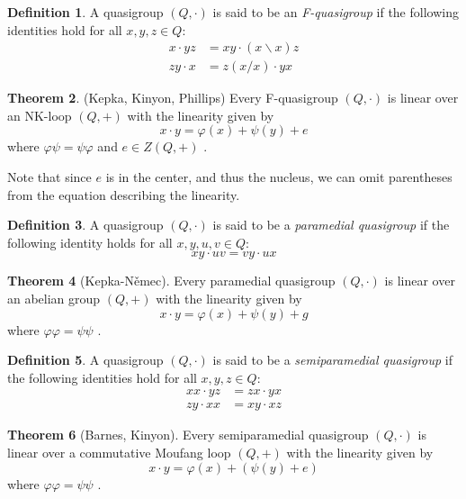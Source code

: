 \documentclass[12pt]{report}
\theoremstyle{definition}
\newtheorem{thm}{Theorem}[chapter]
\newtheorem{dfn}[thm]{Definition}
\newcommand{\ldv}{\backslash}       %
\newcommand{\rdv}{/}                %
\begin{document}
\begin{dfn}
  A quasigroup $(Q, \cdot)$ is said to be an \emph{F-quasigroup} if the following identities hold
    for all $x, y, z \in Q$:
  \begin{align*}
    x\cdot yz &= xy\cdot (x\ldv x)z\\
    zy\cdot x &= z(x\rdv x) \cdot yx
  \end{align*}
\end{dfn}

\begin{thm}(Kepka, Kinyon, Phillips)
  Every F-quasigroup $(Q, \cdot)$ is linear over an NK-loop $(Q, +)$ with the linearity given by
  \[x\cdot y = \varphi(x) + \psi(y) + e\]
  where $\varphi\psi = \psi\varphi$ and $e\in Z(Q, +)$ \cite{KepkaKinyonPhillips}.
\end{thm}

Note that since $e$ is in the center, and thus the nucleus, we can omit parentheses from the equation
  describing the linearity.

\begin{dfn}
  A quasigroup $(Q, \cdot)$ is said to be a \emph{paramedial quasigroup} if the following identity holds
    for all $x, y, u, v\in Q$:
  \[xy\cdot uv = vy\cdot ux\]
\end{dfn}

\begin{thm}[Kepka-N\v{e}mec]
  Every paramedial quasigroup $(Q, \cdot)$ is linear over an abelian group $(Q, +)$ with the linearity
    given by
  \[x\cdot y = \varphi(x) + \psi(y) + g\]
  where $\varphi\varphi = \psi\psi$ \cite{SP}.
\end{thm}

\begin{dfn}
  A quasigroup $(Q, \cdot)$ is said to be a \emph{semiparamedial quasigroup} if the following identities
    hold for all $x, y, z\in Q$:
  \begin{align*}
    xx\cdot yz &= zx\cdot yx\\
    zy\cdot xx &= xy\cdot xz
  \end{align*}
\end{dfn}

\begin{thm}[Barnes, Kinyon]
  Every semiparamedial quasigroup $(Q, \cdot)$ is linear over a commutative Moufang loop $(Q, +)$ with
    the linearity given by
  \[x\cdot y = \varphi(x) + (\psi(y) + e)\]
  where $\varphi\varphi = \psi\psi$ \cite{BK-isotopes}.
\end{thm}
\end{document}
